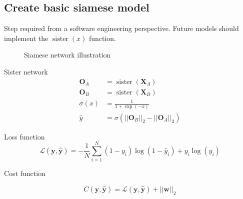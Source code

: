 \subsection{Create basic siamese model}
\begin{frame}{\insertsubsec}
  Step required from a software engineering perspective. Future models should implement the 
  \( \operatorname{sister}(x) \) function.
  \begin{figure}
    \scalebox{.7}{}
    \caption{Siamese network illustration}
  \end{figure}
\end{frame}
\begin{frame}
  \begin{block}{Sister network}
    \begin{align*}
      \bm{O}_A &= \operatorname{sister}(\bm{X}_A) \\
      \bm{O}_B &= \operatorname{sister}(\bm{X}_B) \\
      \sigma(x) &= \frac{1}{1 + \exp(-x)} \\
      \hat{y} &= \sigma(||\bm{O}_B||_2 - ||\bm{O}_A||_2) 
    \end{align*}
  \end{block}

  \begin{block}{Loss function}
    \[
      \mathcal{L}(\bm{y}, \hat{\bm{y}}) = -\frac{1}{N} \sum_{i = 1}^{N}
      (1 - y_i)\log(1 - \hat{y}_i) + y_i\log(\hat{y}_i)
    \]
  \end{block}

  \begin{block}{Cost function}
    
    \[
      C(\bm{y}, \hat{\bm{y}}) = \mathcal{L}(\bm{y}, \hat{\bm{y}}) + 
      ||\bm{w}||_2
    \]
  \end{block}
\end{frame}

